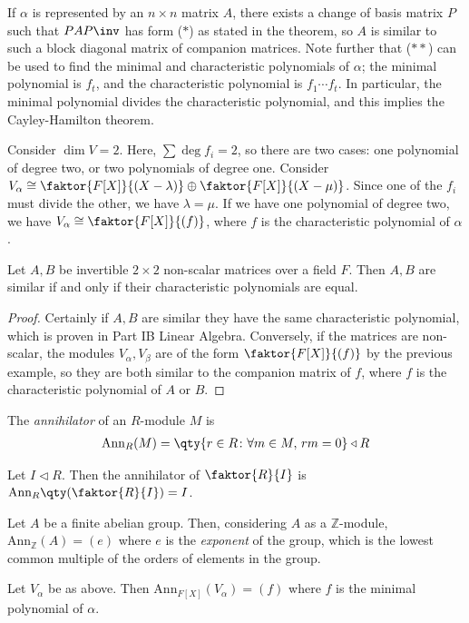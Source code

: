 \begin{remark}
	If $\alpha$ is represented by an $n \times n$ matrix $A$, there exists a change of basis matrix $P$ such that $PAP\inv$ has form (\(\ast\)) as stated in the theorem, so $A$ is similar to such a block diagonal matrix of companion matrices.
	Note further that (\(\ast\ast\)) can be used to find the minimal and characteristic polynomials of $\alpha$; the minimal polynomial is $f_t$, and the characteristic polynomial is $f_1 \cdots f_t$.
	In particular, the minimal polynomial divides the characteristic polynomial, and this implies the Cayley-Hamilton theorem.
\end{remark}
\begin{example}
	Consider $\dim V = 2$.
	Here, $\sum \deg f_i = 2$, so there are two cases: one polynomial of degree two, or two polynomials of degree one.
	Consider $V_\alpha \cong \faktor{F[X]}{(X-\lambda)} \oplus \faktor{F[X]}{(X-\mu)}$.
	Since one of the $f_i$ must divide the other, we have $\lambda = \mu$.
	If we have one polynomial of degree two, we have $V_\alpha \cong \faktor{F[X]}{(f)}$, where $f$ is the characteristic polynomial of $\alpha$.
\end{example}
\begin{corollary}
	Let $A, B$ be invertible $2 \times 2$ non-scalar matrices over a field $F$.
	Then $A, B$ are similar if and only if their characteristic polynomials are equal.
\end{corollary}
\begin{proof}
	Certainly if $A, B$ are similar they have the same characteristic polynomial, which is proven in Part IB Linear Algebra.
	Conversely, if the matrices are non-scalar, the modules $V_\alpha, V_\beta$ are of the form $\faktor{F[X]}{(f)}$ by the previous example, so they are both similar to the companion matrix of $f$, where $f$ is the characteristic polynomial of $A$ or $B$.
\end{proof}
\begin{definition}
	The \textit{annihilator} of an $R$-module $M$ is
	\begin{align*}
		\mathrm{Ann}_R(M) = \qty{r \in R \colon \forall m \in M,\, rm = 0} \triangleleft R
	\end{align*}
\end{definition}
\begin{example}
	Let $I \triangleleft R$.
	Then the annihilator of $\faktor{R}{I}$ is $\mathrm{Ann}_R\qty(\faktor{R}{I}) = I$.

	Let $A$ be a finite abelian group.
	Then, considering $A$ as a $\mathbb Z$-module, $\mathrm{Ann}_{\mathbb Z}(A) = (e)$ where $e$ is the \textit{exponent} of the group, which is the lowest common multiple of the orders of elements in the group.

	Let $V_\alpha$ be as above.
	Then $\mathrm{Ann}_{F[X]}(V_\alpha) = (f)$ where $f$ is the minimal polynomial of $\alpha$.
\end{example}

